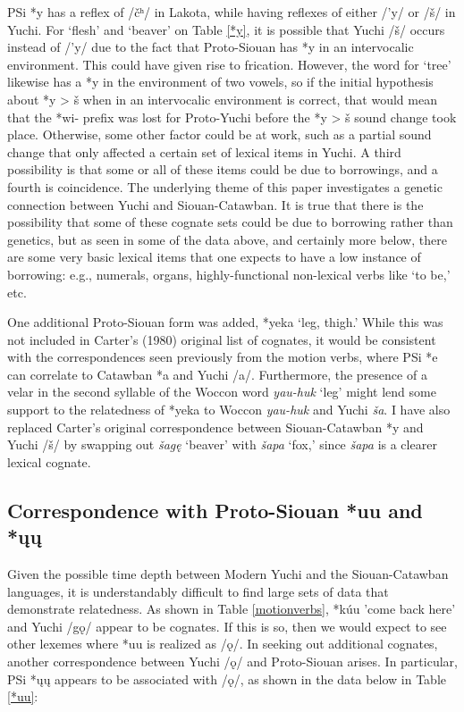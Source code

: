 \documentclass[output=paper]{LSP/langsci}
\begin{document}
{PSi *y has a reflex of /\v{c}ʰ/ in Lakota, while having reflexes of either /'y/ or /\v{s}/ in Yuchi. For `flesh' and `beaver' on Table \ref{*y}, it is possible that Yuchi /\v{s}/ occurs instead of /'y/ due to the fact that Proto-Siouan has *y in an intervocalic environment. This could have given rise to frication. However, the word for `tree' likewise has a *y in the environment of two vowels, so if the initial hypothesis about *y > \v{s} when in an intervocalic environment is correct, that would mean that the *wi- prefix was lost for Proto-Yuchi before the *y > \v{s} sound change took place. Otherwise, some other factor could be at work, such as a partial sound change that only affected a certain set of lexical items in Yuchi. A third possibility is that some or all of these items could be due to borrowings, and a fourth is coincidence. The underlying theme of this paper investigates a genetic connection between Yuchi and Siouan-Catawban. It is true that there is the possibility that some of these cognate sets could be due to borrowing rather than genetics, but as seen in some of the data above, and certainly more below, there are some very basic lexical items that one expects to have a low instance of borrowing: e.g., numerals, organs, highly-functional non-lexical verbs like `to be,' etc. 

One additional Proto-Siouan form was added, *yeka `leg, thigh.' While this was not included in Carter's (1980) original list of cognates, it would be consistent with the correspondences seen previously from the motion verbs, where PSi *e can correlate to Catawban *a and Yuchi /a/. Furthermore, the presence of a velar in the second syllable of the Woccon word \emph{yau-huk} `leg' might lend some support to the relatedness of *yeka to Woccon \emph{yau-huk} and Yuchi \emph{\v{s}a}. I have also replaced Carter's original correspondence between Siouan-Catawban *y and Yuchi /\v{s}/ by swapping out \emph{\v{s}ag\k{e}} `beaver' with \emph{\v{s}apa} `fox,' since \emph{\v{s}apa} is a clearer lexical cognate.

\subsection{Correspondence with Proto-Siouan *uu and *\k{u}\k{u}}

Given the possible time depth between Modern Yuchi and the Siouan-Catawban languages, it is understandably difficult to find large sets of data that demonstrate relatedness. As shown in Table \ref{motionverbs}, *k\'uu 'come back here' and Yuchi /g\k{o}/ appear to be cognates. If this is so, then we would expect to see other lexemes where *uu is realized as /\k{o}/. In seeking out additional cognates, another correspondence between Yuchi /\k{o}/ and Proto-Siouan arises. In particular, PSi *\k{u}\k{u} appears to be associated with /\k{o}/, as shown in the data below in Table \ref{*uu}:

}
\end{document}
